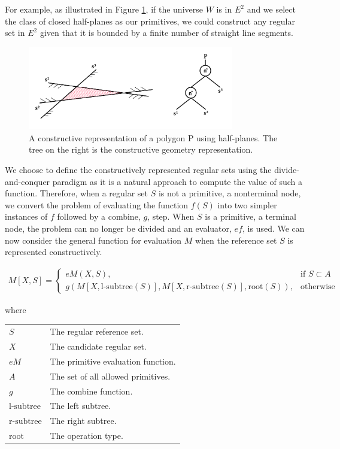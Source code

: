 \documentclass[a4paper,11pt,oneside]{article}
\makeatletter
\newenvironment{conditions}
  {\par\vspace{\abovedisplayskip}\noindent\begin{tabular}{>{$}l<{$} @{${}={}$} l}}
  {\end{tabular}\par\vspace{\belowdisplayskip}}
\makeatother
\begin{document}
For example, as illustrated in Figure \ref{sect3:halfplane-csg}, if the universe $W$ is in $E^2$ and we select the class of closed half-planes as our primitives, we could construct any regular set in $E^2$ given that it is bounded by a finite number of straight line segments.

\begin{figure}[ht]
	\begin{center}
		\includegraphics[width=0.8\textwidth]{section3/3.2/halfplane-csg.png}
	\end{center}
	\caption{A constructive representation of a polygon P using half-planes. The tree on the right is the constructive geometry representation.}
	\label{sect3:halfplane-csg}
\end{figure}

We choose to define the constructively represented regular sets using the divide-and-conquer paradigm as it is a natural approach to compute the value of such a function. Therefore, when a regular set $S$ is not a primitive, a nonterminal node, we convert the problem of evaluating the function $f(S)$ into two simpler instances of $f$ followed by a combine, $g$, step. When $S$ is a primitive, a terminal node, the problem can no longer be divided and an evaluator, $ef$, is used. We can now consider the general function for evaluation $M$ when the reference set $S$ is represented constructively.

\begin{align}
	M[X,S]= 
	\begin{cases}
	eM(X, S),                                                                & \text{if } S \subset A \\
	g(M[X, \text{l-subtree}(S)], M[X, \text{r-subtree}(S)], \text{root}(S)), & \text{otherwise}       
	\end{cases}
\end{align}

where

\begin{conditions}
	S     				  &  The regular reference set. \\
	X     				  &  The candidate regular set. \\
	eM     	  &  The primitive evaluation function. \\
	A     			  	  &  The set of all allowed primitives. \\
	g     				  &  The combine function. \\
	\text{l-subtree}     &  The left subtree. \\
	\text{r-subtree}     &  The right subtree. \\
	\text{root}     	  &  The operation type. \\
\end{conditions}
\end{document}
